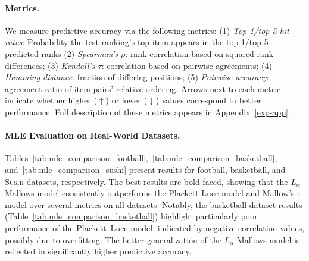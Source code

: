 \documentclass{article}
\begin{document}
\paragraph{Metrics.}
We measure predictive accuracy via the following metrics: (1) \textit{Top-1/top-5 hit rates}: Probability the test ranking's top item appears in the top-1/top-5 predicted ranks  (2) \textit{Spearman's $\rho$}: rank correlation based on squared rank differences; (3) \textit{Kendall's $\tau$}: correlation based on pairwise agreements; (4) \textit{Hamming distance}: fraction of differing positions; (5) \textit{Pairwise accuracy}: agreement ratio of item pairs' relative ordering. 
Arrows next to each metric indicate whether higher ($\uparrow$) or lower ($\downarrow$) values correspond to better performance.
Full description of these metrics appears in Appendix~\ref{exp-app}.


\paragraph{MLE Evaluation on Real-World Datasets.}
Tables~\ref{tab:mle_comparison_football},~\ref{tab:mle_comparison_basketball}, and~\ref{tab:mle_comparison_sushi} present results for football, basketball, and \textsc{Sushi} datasets, respectively. The best results are bold-faced, showing that the \(L_\alpha\)-Mallows model consistently outperforms the Plackett-Luce model and Mallow's $\tau$ model over several metrics on all datasets.
Notably, the basketball dataset results (Table~\ref{tab:mle_comparison_basketball}) highlight particularly poor performance of the Plackett–Luce model, indicated by negative correlation values, possibly due to overfitting. The better generalization of the $L_\alpha$ Mallows model is reflected in significantly higher predictive accuracy. 
\end{document}
